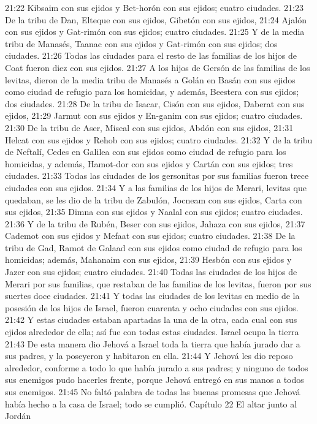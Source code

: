 21:22 Kibsaim con sus ejidos y Bet-horón con sus ejidos; cuatro ciudades.  
21:23 De la tribu de Dan, Elteque con sus ejidos, Gibetón con sus ejidos,  
21:24 Ajalón con sus ejidos y Gat-rimón con sus ejidos; cuatro ciudades.  
21:25 Y de la media tribu de Manasés, Taanac con sus ejidos y Gat-rimón con sus ejidos; dos ciudades.  
21:26 Todas las ciudades para el resto de las familias de los hijos de Coat fueron diez con sus ejidos.  
21:27 A los hijos de Gersón de las familias de los levitas, dieron de la media tribu de Manasés a Golán en Basán con sus ejidos como ciudad de refugio para los homicidas, y además, Beestera con sus ejidos; dos ciudades.  
21:28 De la tribu de Isacar, Cisón con sus ejidos, Daberat con sus ejidos,  
21:29 Jarmut con sus ejidos y En-ganim con sus ejidos; cuatro ciudades.  
21:30 De la tribu de Aser, Miseal con sus ejidos, Abdón con sus ejidos,  
21:31 Helcat con sus ejidos y Rehob con sus ejidos; cuatro ciudades.  
21:32 Y de la tribu de Neftalí, Cedes en Galilea con sus ejidos como ciudad de refugio para los homicidas, y además, Hamot-dor con sus ejidos y Cartán con sus ejidos; tres ciudades.  
21:33 Todas las ciudades de los gersonitas por sus familias fueron trece ciudades con sus ejidos.  
21:34 Y a las familias de los hijos de Merari, levitas que quedaban, se les dio de la tribu de Zabulón, Jocneam con sus ejidos, Carta con sus ejidos,  
21:35 Dimna con sus ejidos y Naalal con sus ejidos; cuatro ciudades.  
21:36 Y de la tribu de Rubén, Beser con sus ejidos, Jahaza con sus ejidos,  
21:37 Cademot con sus ejidos y Mefaat con sus ejidos; cuatro ciudades.  
21:38 De la tribu de Gad, Ramot de Galaad con sus ejidos como ciudad de refugio para los homicidas; además, Mahanaim con sus ejidos, 
21:39 Hesbón con sus ejidos y Jazer con sus ejidos; cuatro ciudades.  
21:40 Todas las ciudades de los hijos de Merari por sus familias, que restaban de las familias de los levitas, fueron por sus suertes doce ciudades.  
21:41 Y todas las ciudades de los levitas en medio de la posesión de los hijos de Israel, fueron cuarenta y ocho ciudades con sus ejidos.  
21:42 Y estas ciudades estaban apartadas la una de la otra, cada cual con sus ejidos alrededor de ella; así fue con todas estas ciudades.  
Israel ocupa la tierra  
21:43 De esta manera dio Jehová a Israel toda la tierra que había jurado dar a sus padres, y la poseyeron y habitaron en ella.  
21:44 Y Jehová les dio reposo alrededor, conforme a todo lo que había jurado a sus padres; y ninguno de todos sus enemigos pudo hacerles frente, porque Jehová entregó en sus manos a todos sus enemigos.  
21:45 No faltó palabra de todas las buenas promesas que Jehová había hecho a la casa de Israel; todo se cumplió.  
Capítulo 22 
El altar junto al Jordán  

